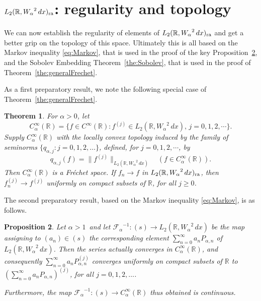\documentclass[12pt, reqno]{amsart}
\numberwithin{equation}{section}
\theoremstyle{plain}
\newtheorem{theorem}{Theorem}[section]
\newtheorem{proposition}[theorem]{Proposition}
\theoremstyle{definition}
\begin{document}
\section{${L_2({{\mathbb R}},{W_\alpha}^2\,dx)_{\textup{ra}}}$: regularity and topology}\label{sec:regularityandtopology}

We can now establish the regularity of elements of ${L_2({{\mathbb R}},{W_\alpha}^2\,dx)_{\textup{ra}}}$ and get a better grip on the topology of this space. Ultimately this is all based on the Markov inequality \eqref{eq:Markov}, that is used in the proof of the key Proposition~\ref{prop:keyprop}, and the Sobolev Embedding Theorem~\ref{the:Sobolev}, that is used in the proof of Theorem~\ref{the:generalFrechet}.

As a first preparatory result, we note the following special case of Theorem~\ref{the:generalFrechet}.

\begin{theorem}\label{the:aFrechet}
For $\alpha>0$, let
\begin{equation*}
{{C_\alpha^\infty({{\mathbb R}})}} =\{f\in C^{\infty}({{\mathbb R}}):f^{(j)}\in {{L_2({{\mathbb R}}, {W_\alpha}^2\,dx)}} ,\, j=0,1,2,\cdots\}.
\end{equation*}
Supply ${{C_\alpha^\infty({{\mathbb R}})}}$ with the locally convex topology induced by the family of seminorms $\{{q_{\alpha, j}} : j=0,1,2,\ldots\}$, defined, for $j=0,1,2,\cdots$,  by
\begin{equation}\label{eq:ajseminormdef}
{q_{\alpha, j}}(f)=\|f^{(j)}\|_{{L_2({{\mathbb R}}, {W_\alpha}^2\,dx)}}\quad(f\in{{C_\alpha^\infty({{\mathbb R}})}}).
\end{equation}
 Then ${{C_\alpha^\infty({{\mathbb R}})}}$ is a Fr\'echet space. If $f_n\to f$ in ${L_2({{\mathbb R}},{W_\alpha}^2\,dx)_{\textup{ra}}}$, then $f_n^{(j)}\to f^{(j)}$ uniformly on  compact subsets of ${{\mathbb R}}$, for all $j\geq 0$.
 \end{theorem}

The second preparatory result, based on the Markov inequality \eqref{eq:Markov}, is as follows.

\begin{proposition}\label{prop:keyprop}
Let $\alpha>1$\ and let ${\mathcal F_\alpha}^{-1}:(s)\to{{L_2({{\mathbb R}}, {W_\alpha}^2\,dx)}}$ be the map assigning to ${({a_n})}\in (s)$ the corresponding element $\sum_{n=0}^\infty a_n P_{\alpha,n}$ of ${{L_2({{\mathbb R}}, {W_\alpha}^2\,dx)}}$. Then the series actually converges in ${{C_\alpha^\infty({{\mathbb R}})}}$, and consequently
$\sum_{n=0}^\infty a_n P_{\alpha,n}^{(j)}$ converges uniformly on compact
subsets of ${{\mathbb R}}$ to $\left(\sum_{n=0}^\infty a_n P_{\alpha,n}\right)^{(j)}$, for all $j=0,1,2,\ldots$.

Furthermore, the map ${\mathcal F_\alpha}^{-1}:(s)\to{{C_\alpha^\infty({{\mathbb R}})}}$ thus obtained is continuous.
\end{proposition}
\end{document}
